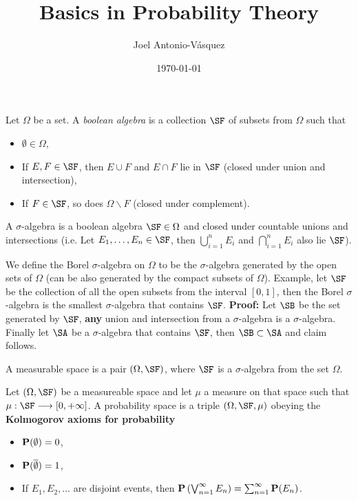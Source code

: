 \documentclass[11pt]{scrartcl}
\begin{document}
\title{Basics in Probability Theory}
\author{Joel Antonio-V\'asquez}
\date{\today}
\maketitle

\begin{definition*}
  Let $\Omega$ be a set. A \emph{boolean algebra} is a collection $\SF$ of subsets from $\Omega$ such that
  \begin{itemize}
    \item{$\emptyset \in \Omega$},
    \item{If $E, F \in \SF$, then $E \cup F$ and $E \cap F$ lie in $\SF$ (closed under union and intersection)},
    \item{If $F \in \SF$, so does $\Omega \backslash F$ (closed under complement).}
  \end{itemize}
\end{definition*}
\begin{definition*}
  A $\sigma$-algebra is a boolean algebra $\SF \in \Omega$ and closed under countable unions and intersections (i.e. Let $E_{1}, \dots, E_{n} \in \SF$, then $\bigcup\limits_{i=1}^{n} E_{i}$ and $\bigcap\limits_{i=1}^{n} E_{i}$ also lie $\SF$).
\end{definition*}
We define the Borel $\sigma$-algebra on $\Omega$ to be the $\sigma$-algebra generated by the open sets of $\Omega$ (can be also generated by the compact subsets of $\Omega$). Example, let $\SF$ be the collection of all the open subsets from the interval $[0, 1]$, then the Borel $\sigma$-algebra is the smallest $\sigma$-algebra that contains $\SF$. \textbf{Proof:} Let $\SB$ be the set generated by $\SF$, \textbf{any} union and intersection from a $\sigma$-algebra is a $\sigma$-algebra. Finally let $\SA$ be a $\sigma$-algebra that contains $\SF$, then $\SB \subset \SA$ and claim follows.
\begin{definition*}
  A measurable space is a pair $(\Omega, \SF)$, where $\SF$ is a $\sigma$-algebra from the set $\Omega$.
\end{definition*}
\begin{definition*}
  Let $(\Omega, \SF)$ be a measureable space and let $\mu$ a measure on that space such that $\mu:\SF \longrightarrow [0, +\infty]$. A probability space is a triple $(\Omega, \SF, \mu)$ obeying the \textbf{Kolmogorov axioms for probability}
  \begin{itemize}
    \item{${\bf P}(\emptyset)=0$},
    \item{${\bf P}(\overline{\emptyset})=1$},
    \item{If $E_ {1}, E_{2}, \dots$ are disjoint events, then ${\bf P}\left( \bigvee_{n=1}^{\infty}E_{n} \right) = \sum_{n=1}^{\infty} {\bf P}(E_{n})$.}
  \end{itemize}
\end{definition*}
\end{document}
